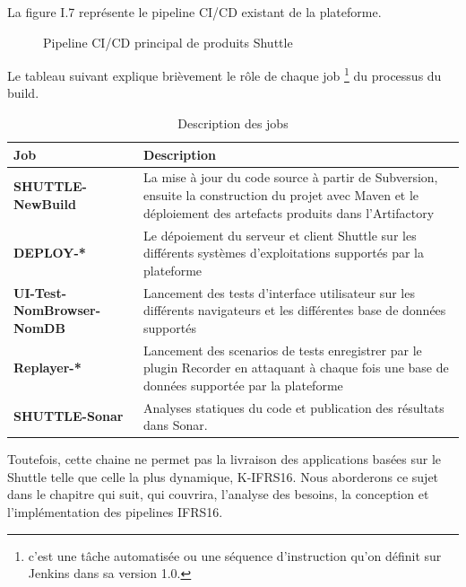 \begin{spacing}{1.2}
\FloatBarrier

La figure I.7 représente le pipeline CI/CD existant de la plateforme. 
\begin{figure}[H]\centering
{}
\caption{Pipeline CI/CD principal de produits Shuttle}
\label{fig:fig5}
\end{figure}

Le tableau suivant explique brièvement le rôle de chaque job \footnote{c'est une tâche automatisée ou une séquence d'instruction qu'on définit sur Jenkins dans sa version 1.0.} du processus du build. 

\begin{table}[ht]
	\centering
	\caption{Description des jobs}
	\footnotesize
	\begin{tabularx}{\textwidth}{|p{3.3cm}|X|}
          \hline
          {\textbf{Job}}
          & 
          {\textbf{Description}} 
          \\
          \hline
          {\textbf{SHUTTLE-NewBuild}} & La mise à jour du code source à partir de Subversion, ensuite la construction du projet avec Maven et le déploiement des artefacts produits dans l'Artifactory\\    \hline
         {\textbf{DEPLOY-*}} &  Le dépoiement du serveur et client Shuttle sur les différents systèmes d'exploitations supportés par la plateforme \\    
          \hline
          {\textbf{UI-Test-NomBrowser-NomDB}} & Lancement des tests d'interface utilisateur sur les différents navigateurs et les différentes base de données supportés   \\          \hline
          {\textbf{Replayer-*}} & Lancement des scenarios de tests enregistrer par le plugin Recorder en attaquant à chaque fois une base de données supportée par la plateforme \\          \hline
          {\textbf{SHUTTLE-Sonar}} & Analyses statiques du code et publication des résultats dans Sonar. \\          \hline
        \end{tabularx}
	\label{tab:exple}
\end{table}

\FloatBarrier

\FloatBarrier

Toutefois, cette chaine ne permet pas la livraison des applications basées sur le Shuttle telle que celle la plus dynamique, K-IFRS16. Nous aborderons ce sujet dans le chapitre qui suit, qui couvrira, l'analyse des besoins, la conception et l'implémentation des pipelines IFRS16.


\end{spacing}
